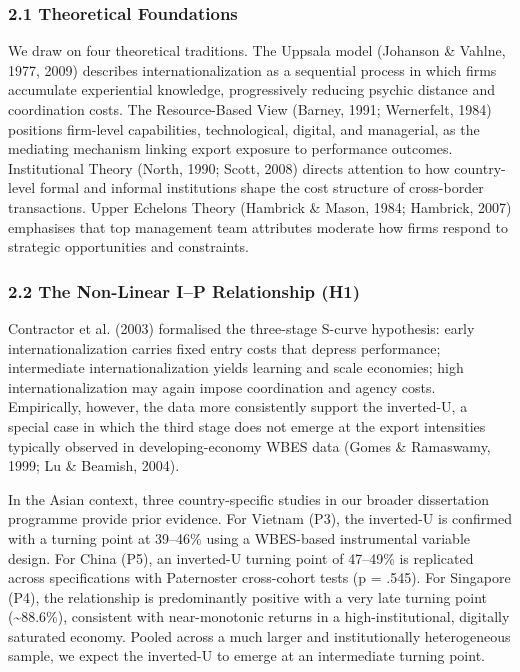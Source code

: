 \documentclass[12pt,a4paper]{article}
\begin{document}
\hypertarget{21-theoretical-foundations}{%
\subsubsection{2.1 Theoretical
Foundations}\label{21-theoretical-foundations}}

We draw on four theoretical traditions. The Uppsala model (Johanson \&
Vahlne, 1977, 2009) describes internationalization as a sequential
process in which firms accumulate experiential knowledge, progressively
reducing psychic distance and coordination costs. The Resource-Based
View (Barney, 1991; Wernerfelt, 1984) positions firm-level capabilities,
technological, digital, and managerial, as the mediating mechanism
linking export exposure to performance outcomes. Institutional Theory
(North, 1990; Scott, 2008) directs attention to how country-level formal
and informal institutions shape the cost structure of cross-border
transactions. Upper Echelons Theory (Hambrick \& Mason, 1984; Hambrick,
2007) emphasises that top management team attributes moderate how firms
respond to strategic opportunities and constraints.

\hypertarget{22-the-non-linear-ip-relationship-h1}{%
\subsubsection{2.2 The Non-Linear I--P Relationship
(H1)}\label{22-the-non-linear-ip-relationship-h1}}

Contractor et al. (2003) formalised the three-stage S-curve hypothesis:
early internationalization carries fixed entry costs that depress
performance; intermediate internationalization yields learning and scale
economies; high internationalization may again impose coordination and
agency costs. Empirically, however, the data more consistently support
the inverted-U, a special case in which the third stage does not emerge
at the export intensities typically observed in developing-economy WBES
data (Gomes \& Ramaswamy, 1999; Lu \& Beamish, 2004).

In the Asian context, three country-specific studies in our broader
dissertation programme provide prior evidence. For Vietnam (P3), the
inverted-U is confirmed with a turning point at 39--46\% using a
WBES-based instrumental variable design. For China (P5), an inverted-U
turning point of 47--49\% is replicated across specifications with
Paternoster cross-cohort tests (p = .545). For Singapore (P4), the
relationship is predominantly positive with a very late turning point
(\textasciitilde88.6\%), consistent with near-monotonic returns in a
high-institutional, digitally saturated economy. Pooled across a much
larger and institutionally heterogeneous sample, we expect the
inverted-U to emerge at an intermediate turning point.
\end{document}
